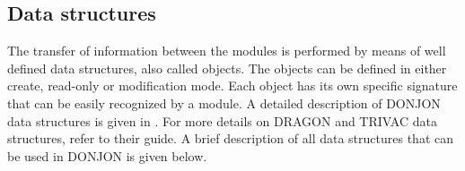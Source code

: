\subsection{Data structures}\label{sect:dat}

\vskip 0.2cm
The transfer of information between the modules is performed by means of well
defined data structures, also called objects. The objects can be defined in either
create, read-only or modification mode. Each object has its own specific signature
that can be easily recognized by a module. A detailed description of DONJON
data structures is given in . For more details on DRAGON and
TRIVAC data structures, refer to their guide\cite{dragstruc}.
A brief description of all data structures that can be used in DONJON is given
below. \\

